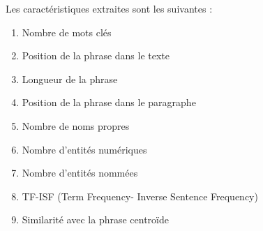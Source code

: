             Les caractéristiques extraites sont les suivantes :
            \begin{enumerate}
                \item{Nombre de mots clés}
                \item{Position de la phrase dans le texte}
                \item{Longueur de la phrase}
                \item{Position de la phrase dans le paragraphe}
                \item{Nombre de noms propres}
                \item{Nombre d'entités numériques}
                \item{Nombre d'entités nommées}
                \item{TF-ISF (Term Frequency- Inverse Sentence Frequency)}
                \item{Similarité avec la phrase centroïde}
            \end{enumerate}    

